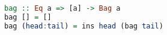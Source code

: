 \begin{lstlisting}[language=haskell]
bag :: Eq a => [a] -> Bag a
bag [] = []
bag (head:tail) = ins head (bag tail)
\end{lstlisting}